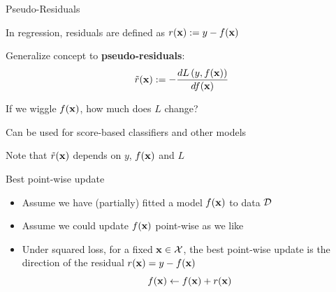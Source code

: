\documentclass[11pt,compress,t,notes=noshow, xcolor=table]{beamer}
\begin{document}

\begin{framei}[sep=M]{Pseudo-Residuals}

\item In regression, residuals are defined as 
$r(\mathbf{x}) := y - f(\mathbf{x})$
\item Generalize concept to \textbf{pseudo-residuals}: 
$$
\tilde{r}(\mathbf{x}) := - \frac{d L\left(y, f(\mathbf{x})\right)}{d f(\mathbf{x})}
$$
\item If we wiggle $f(\mathbf{x})$, how much does $L$ change?
\item Can be used for score-based classifiers and other models
\item Note that $\tilde{r}(\mathbf{x})$ depends on $y$, $f(\mathbf{x})$ and $L$

\vfill


\end{framei}


\begin{frame}[t]{Best point-wise update}

\begin{overlayarea}{\textwidth}{\textheight}

\begin{itemize}
\item Assume we have (partially) fitted a model $f(\mathbf{x})$ to data $\mathcal{D}$ 
\item Assume we could update $f(\mathbf{x})$ point-wise as we like 
\item Under squared loss, for a fixed $\mathbf{x} \in \mathcal{X}$, the best point-wise update is the direction of the residual $r(\mathbf{x}) = y - f(\mathbf{x})$
$$
f(\mathbf{x}) \leftarrow f(\mathbf{x}) + r(\mathbf{x})
$$
\end{itemize}



\end{overlayarea} 

\end{frame}
\end{document}
